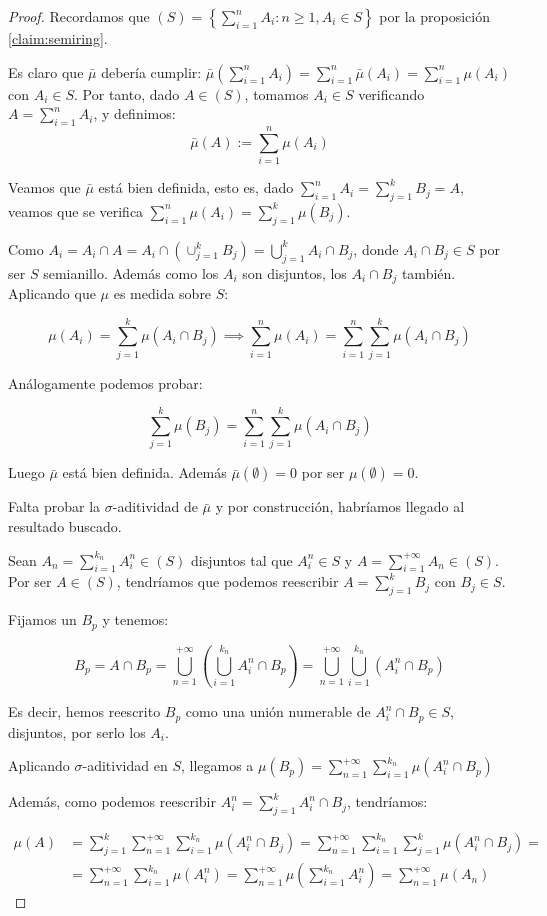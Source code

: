 \begin{proof}
 Recordamos que $(S) = \left\{\sum_{i=1}^n A_i: n\ge 1, A_i \in S \right\}$ por la proposición \ref{claim:semiring}.
 
 Es claro que $\bar{\mu}$ debería cumplir: 
 $\bar{\mu}\left(\sum_{i=1}^n A_i\right) = \sum_{i=1}^n \bar{\mu}(A_i) = \sum_{i=1}^n \mu(A_i)$
 con $A_i \in S$. Por tanto, dado $A\in (S)$, tomamos $A_i\in S$ verificando $A = \sum_{i=1}^n A_i$, y definimos: 
 \[\bar{\mu}(A) := \sum_{i=1}^n \mu(A_i)\]
 
 Veamos que $\bar{\mu}$ está bien definida, esto es, dado $\sum_{i=1}^n A_i = \sum_{j=1}^k B_j = A$, 
 veamos que se verifica $\sum_{i=1}^n \mu(A_i) = \sum_{j=1}^k \mu(B_j)$.
 
 Como $A_i = A_i \cap A = A_i \cap \left(\cup_{j=1}^k B_j\right) = \bigcup_{j=1}^k A_i \cap B_j$, donde 
 $A_i \cap B_j \in S$ por ser $S$ semianillo. Además como los $A_i$ son disjuntos, los $A_i\cap B_j$ también.
 Aplicando que $\mu$ es medida sobre $S$:
 
 \[\mu(A_i) = \sum_{j=1}^k \mu(A_i \cap B_j) \implies \sum_{i=1}^n \mu(A_i) = 
              \sum_{i=1}^n \sum_{j=1}^k \mu(A_i \cap B_j)\]
 
 Análogamente podemos probar:
 
 \[\sum_{j=1}^k \mu(B_j) = \sum_{i=1}^n \sum_{j=1}^k \mu(A_i \cap B_j)\]
 
 Luego $\bar{\mu}$ está bien definida. Además $\bar{\mu} (\emptyset) = 0$ por ser $\mu(\emptyset) = 0$.
 
 Falta probar la $\sigma$-aditividad de $\bar{\mu}$ y por construcción, habríamos llegado al resultado buscado.
 
 Sean $A_n = \sum_{i=1}^{k_n} A_i^n \in (S)$ disjuntos tal que $A_i^n \in S$ y $A = \sum_{i=1}^{+\infty} A_n \in (S)$. 
 Por ser $A \in (S)$, tendríamos que podemos reescribir $A = \sum_{j=1}^k B_j$ con $B_j \in S$.
 
 Fijamos un $B_p$ y tenemos:
 
 \[B_p = A \cap B_p = \bigcup_{n=1}^{+\infty} \left(\bigcup_{i=1}^{k_n} A_i^n \cap B_p\right) = 
         \bigcup_{n=1}^{+\infty} \bigcup_{i=1}^{k_n} \left(A_i^n \cap B_p\right)\]
 
 Es decir, hemos reescrito $B_p$ como una unión numerable de $A_i^n \cap B_p \in S$, disjuntos, por serlo los $A_i$. 
 
 Aplicando $\sigma$-aditividad en $S$, llegamos a $\mu(B_p) = \sum_{n=1}^{+\infty} \sum_{i=1}^{k_n} \mu(A_i^n \cap B_p)$
 
 Además, como podemos reescribir $A_i^{n} = \sum_{j=1}^k A_i^{n} \cap B_j$, tendríamos:
 
 \begin{align*}
 \mu(A) &= \sum_{j=1}^k \sum_{n=1}^{+\infty} \sum_{i=1}^{k_n} \mu(A_i^n \cap B_j) = 
           \sum_{n=1}^{+\infty} \sum_{i=1}^{k_n} \sum_{j=1}^k \mu(A_i^n \cap B_j) = \\
        &= \sum_{n=1}^{+\infty} \sum_{i=1}^{k_n} \mu(A_i^n) =
           \sum_{n=1}^{+\infty} \mu \left(\sum_{i=1}^{k_n} A_i^n \right) =
           \sum_{n=1}^{+\infty} \mu(A_n)
 \end{align*}
\end{proof}

